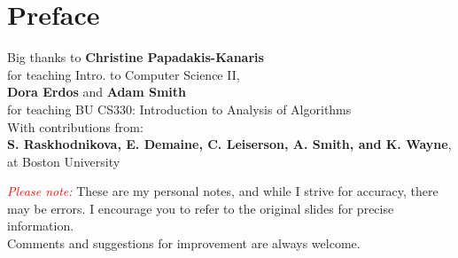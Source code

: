 \chapter*{Preface}

\begin{center}
    \vfill
    \Large{Big thanks to \textbf{Christine Papadakis-Kanaris}}\\
    \normalsize 
    for teaching Intro. to Computer Science II,\\
    \Large{\textbf{Dora Erdos}} and  \textbf{Adam Smith}\\
    \normalsize 
    for teaching BU CS330: Introduction to Analysis of Algorithms\\
    With contributions from:\\
    \textbf{S. Raskhodnikova, E. Demaine, C. Leiserson, A. Smith, and K. Wayne},\\
    at Boston University
    

    \vspace{3em}
    \textcolor{red}{\textit{Please note:}} These are my personal notes, and while I strive for accuracy, there may be errors. I encourage you to refer to the original slides for precise information.\\
    Comments and suggestions for improvement are always welcome.
    \vfill
\end{center}
